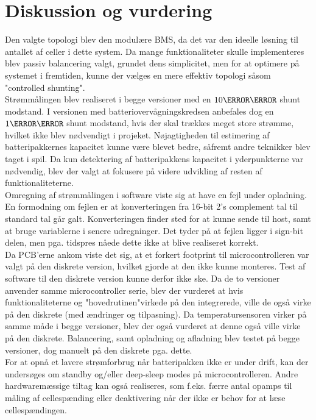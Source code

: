\chapter{Diskussion og vurdering}\label{kap:diskussion}
Den valgte topologi blev den modulære BMS, da det var den ideelle løsning til antallet af celler i dette system. Da mange funktionaliteter skulle implementeres blev passiv balancering valgt, grundet dens simplicitet, men for at optimere på systemet i fremtiden, kunne der vælges en mere effektiv topologi såsom "controlled shunting". \\ 

Strømmålingen blev realiseret i begge versioner med en $10\milli\ohm$ shunt modstand. I versionen med batteriovervågningskredsen anbefales dog en $1\milli\ohm$ shunt modstand, hvis der skal trækkes meget store strømme, hvilket ikke blev nødvendigt i projeket. Nøjagtigheden til estimering af batteripakkernes kapacitet kunne være blevet bedre, såfremt andre teknikker blev taget i spil. Da kun detektering af batteripakkens kapacitet i yderpunkterne var nødvendig, blev der valgt at fokusere på videre udvikling af resten af funktionaliteterne. \\

Omregning af strømmålingen i software viste sig at have en fejl under opladning. En formodning om fejlen er at konverteringen fra 16-bit 2's complement tal til standard tal går galt. Konverteringen finder sted for at kunne sende til host, samt at bruge variablerne i senere udregninger. Det tyder på at fejlen ligger i sign-bit delen, men pga. tidspres nåede dette ikke at blive realiseret korrekt. \\

Da PCB'erne ankom viste det sig, at et forkert footprint til microcontrolleren var valgt på den diskrete version, hvilket gjorde at den ikke kunne monteres. Test af software til den diskrete version kunne derfor ikke ske. Da de to versioner anvender samme microcontroller serie, blev der vurderet at hvis funktionaliteterne og "hovedrutinen"\space virkede på den integrerede, ville de også virke på den diskrete (med ændringer og tilpasning). Da temperatursensoren virker på samme måde i begge versioner, blev der også vurderet at denne også ville virke på den diskrete. Balancering, samt opladning og afladning blev testet på begge versioner, dog manuelt på den diskrete pga. dette. \\

For at opnå et lavere strømforbrug når batteripakken ikke er under drift, kan der undersøges om standby og/eller deep-sleep modes på microcontrolleren. Andre hardwaremæssige tiltag kan også realiseres, som f.eks. færre antal opamps til måling af cellespænding eller deaktivering når der ikke er behov for at læse cellespændingen. \\
